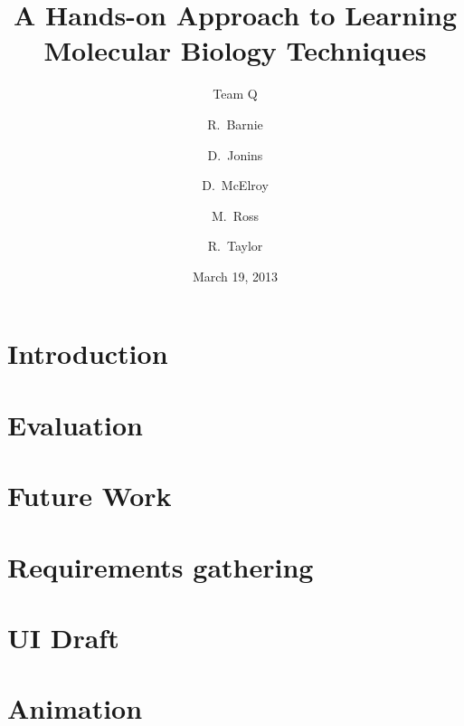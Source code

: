 \documentclass{beamer}
\title[PCR]{A Hands-on Approach to Learning Molecular Biology Techniques}
\subtitle{Team Q}
\author{R.~Barnie \and D.~Jonins \and D.~McElroy \and M.~Ross \and R.~Taylor}
\date{March 19, 2013}
\begin{document}
\section{Introduction}




\section{Evaluation}




\section{Future Work}


\section{Requirements gathering}


\section{UI Draft}


\section{Animation}

\end{document}
